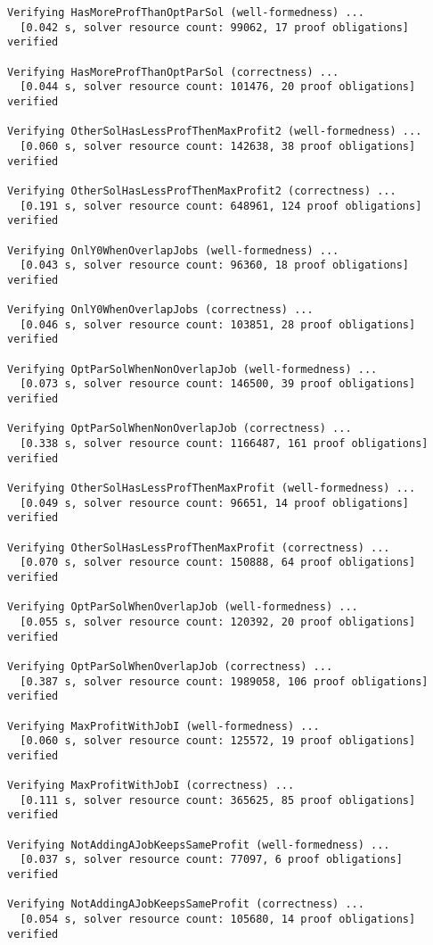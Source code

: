 \begin{Verbatim}[fontsize=\footnotesize]
Verifying HasMoreProfThanOptParSol (well-formedness) ...
  [0.042 s, solver resource count: 99062, 17 proof obligations]  verified

Verifying HasMoreProfThanOptParSol (correctness) ...
  [0.044 s, solver resource count: 101476, 20 proof obligations]  verified

Verifying OtherSolHasLessProfThenMaxProfit2 (well-formedness) ...
  [0.060 s, solver resource count: 142638, 38 proof obligations]  verified

Verifying OtherSolHasLessProfThenMaxProfit2 (correctness) ...
  [0.191 s, solver resource count: 648961, 124 proof obligations]  verified

Verifying OnlY0WhenOverlapJobs (well-formedness) ...
  [0.043 s, solver resource count: 96360, 18 proof obligations]  verified

Verifying OnlY0WhenOverlapJobs (correctness) ...
  [0.046 s, solver resource count: 103851, 28 proof obligations]  verified

Verifying OptParSolWhenNonOverlapJob (well-formedness) ...
  [0.073 s, solver resource count: 146500, 39 proof obligations]  verified

Verifying OptParSolWhenNonOverlapJob (correctness) ...
  [0.338 s, solver resource count: 1166487, 161 proof obligations]  verified

Verifying OtherSolHasLessProfThenMaxProfit (well-formedness) ...
  [0.049 s, solver resource count: 96651, 14 proof obligations]  verified

Verifying OtherSolHasLessProfThenMaxProfit (correctness) ...
  [0.070 s, solver resource count: 150888, 64 proof obligations]  verified

Verifying OptParSolWhenOverlapJob (well-formedness) ...
  [0.055 s, solver resource count: 120392, 20 proof obligations]  verified

Verifying OptParSolWhenOverlapJob (correctness) ...
  [0.387 s, solver resource count: 1989058, 106 proof obligations]  verified

Verifying MaxProfitWithJobI (well-formedness) ...
  [0.060 s, solver resource count: 125572, 19 proof obligations]  verified

Verifying MaxProfitWithJobI (correctness) ...
  [0.111 s, solver resource count: 365625, 85 proof obligations]  verified

Verifying NotAddingAJobKeepsSameProfit (well-formedness) ...
  [0.037 s, solver resource count: 77097, 6 proof obligations]  verified

Verifying NotAddingAJobKeepsSameProfit (correctness) ...
  [0.054 s, solver resource count: 105680, 14 proof obligations]  verified


\end{Verbatim}

